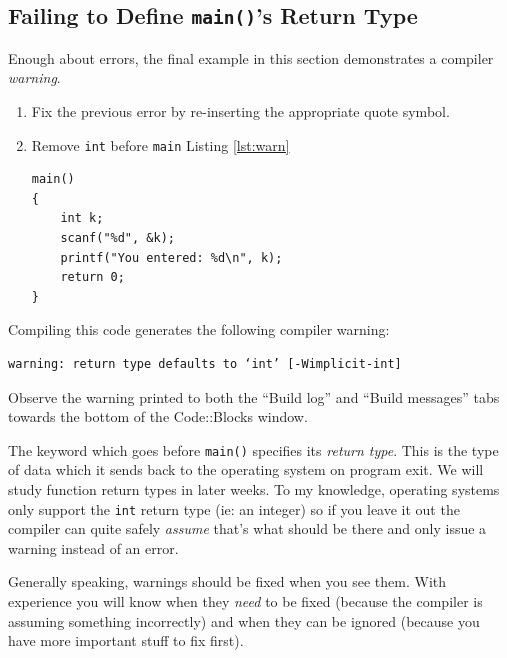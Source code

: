 \documentclass{lab}
\begin{document}
\subsection{Failing to Define \texttt{main()}'s Return Type}

Enough about errors, the final example in this section demonstrates a compiler \textit{warning}. 

\begin{task}{}{}
\begin{enumerate}
\item Fix the previous error by re-inserting the appropriate quote symbol.
\item Remove \texttt{int} before \texttt{main} Listing \ref{lst:warn}

\begin{lstlisting}[style=CStyle,caption=Example code which generates a warning.,label=lst:warn]
main()
{
    int k;
    scanf("%d", &k);
    printf("You entered: %d\n", k);
    return 0;
}
\end{lstlisting}
\end{enumerate}
\end{task}

Compiling this code generates the following compiler warning:

\begin{lstlisting}[basicstyle=\ttfamily,frame=single,caption=Compiler output produced when \texttt{main()} return type is omitted.,captionpos=b]
warning: return type defaults to ‘int’ [-Wimplicit-int]
\end{lstlisting}

Observe the warning printed to both the ``Build log'' and ``Build messages'' tabs towards the bottom of the Code::Blocks window.

The keyword which goes before \texttt{main()} specifies its \textit{return type}. This is the type of data which it sends back to the operating system on program exit. We will study function return types in later weeks. To my knowledge, operating systems only support the \texttt{int} return type (ie: an integer) so if you leave it out the compiler can quite safely \textit{assume} that's what should be there and only issue a warning instead of an error.

Generally speaking, warnings should be fixed when you see them. With experience you will know when they \textit{need} to be fixed (because the compiler is assuming something incorrectly) and when they can be ignored (because you have more important stuff to fix first).
\end{document}
